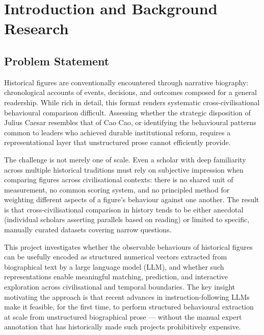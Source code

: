 \documentclass[11pt, a4paper]{report}
\begin{document}
\clearpage

\tableofcontents
\clearpage
\listoffigures
\clearpage
\listoftables
\clearpage

\pagestyle{fancy}

\chapter{Introduction and Background Research}

\section{Problem Statement}

Historical figures are conventionally encountered through narrative biography: chronological accounts of events, decisions, and outcomes composed for a general readership. While rich in detail, this format renders systematic cross-civilisational behavioural comparison difficult. Assessing whether the strategic disposition of Julius Caesar resembles that of Cao Cao, or identifying the behavioural patterns common to leaders who achieved durable institutional reform, requires a representational layer that unstructured prose cannot efficiently provide.

The challenge is not merely one of scale. Even a scholar with deep familiarity across multiple historical traditions must rely on subjective impression when comparing figures across civilisational contexts: there is no shared unit of measurement, no common scoring system, and no principled method for weighting different aspects of a figure's behaviour against one another. The result is that cross-civilisational comparison in history tends to be either anecdotal (individual scholars asserting parallels based on reading) or limited to specific, manually curated datasets covering narrow questions.

This project investigates whether the observable behaviours of historical figures can be usefully encoded as structured numerical vectors extracted from biographical text by a large language model (LLM), and whether such representations enable meaningful matching, prediction, and interactive exploration across civilisational and temporal boundaries. The key insight motivating the approach is that recent advances in instruction-following LLMs make it feasible, for the first time, to perform structured behavioural extraction at scale from unstructured biographical prose — without the manual expert annotation that has historically made such projects prohibitively expensive.
\end{document}
